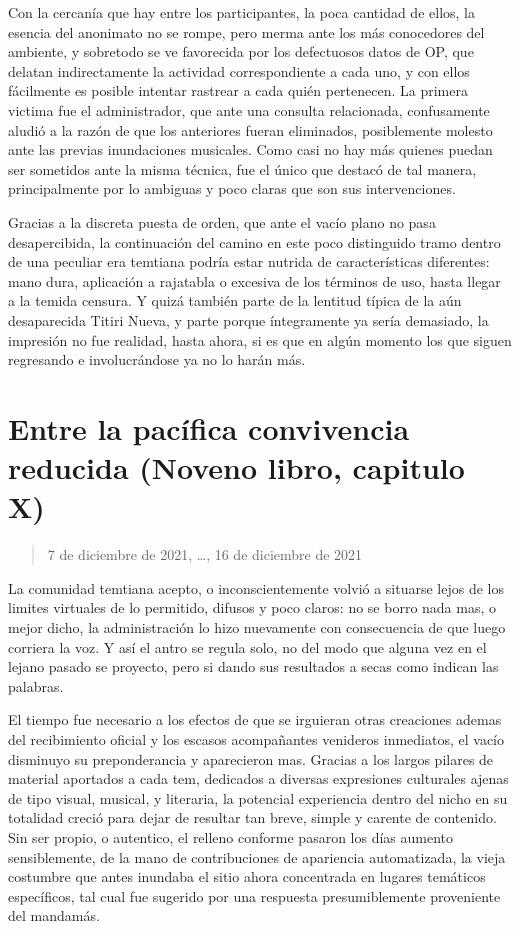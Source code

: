 \documentclass[
  spanish,
]{book}
\begin{document}
Con la cercanía que hay entre los participantes, la poca cantidad de ellos, la esencia del anonimato no se rompe, pero merma ante los más conocedores del ambiente, y sobretodo se ve favorecida por los defectuosos datos de OP, que delatan indirectamente la actividad correspondiente a cada uno, y con ellos fácilmente es posible intentar rastrear a cada quién pertenecen. La primera victima fue el administrador, que ante una consulta relacionada, confusamente aludió a la razón de que los anteriores fueran eliminados, posiblemente molesto ante las previas inundaciones musicales. Como casi no hay más quienes puedan ser sometidos ante la misma técnica, fue el único que destacó de tal manera, principalmente por lo ambiguas y poco claras que son sus intervenciones.

Gracias a la discreta puesta de orden, que ante el vacío plano no pasa desapercibida, la continuación del camino en este poco distinguido tramo dentro de una peculiar era temtiana podría estar nutrida de características diferentes: mano dura, aplicación a rajatabla o excesiva de los términos de uso, hasta llegar a la temida censura. Y quizá también parte de la lentitud típica de la aún desaparecida Titiri Nueva, y parte porque íntegramente ya sería demasiado, la impresión no fue realidad, hasta ahora, si es que en algún momento los que siguen regresando e involucrándose ya no lo harán más.

\hypertarget{entre-la-pacuxedfica-convivencia-reducida-noveno-libro-capitulo-x}{%
\section{Entre la pacífica convivencia reducida (Noveno libro, capitulo X)}\label{entre-la-pacuxedfica-convivencia-reducida-noveno-libro-capitulo-x}}

\begin{quote}
7 de diciembre de 2021, \ldots, 16 de diciembre de 2021
\end{quote}

La comunidad temtiana acepto, o inconscientemente volvió a situarse lejos de los limites virtuales de lo permitido, difusos y poco claros: no se borro nada mas, o mejor dicho, la administración lo hizo nuevamente con consecuencia de que luego corriera la voz. Y así el antro se regula solo, no del modo que alguna vez en el lejano pasado se proyecto, pero si dando sus resultados a secas como indican las palabras.

El tiempo fue necesario a los efectos de que se irguieran otras creaciones ademas del recibimiento oficial y los escasos acompañantes venideros inmediatos, el vacío disminuyo su preponderancia y aparecieron mas. Gracias a los largos pilares de material aportados a cada tem, dedicados a diversas expresiones culturales ajenas de tipo visual, musical, y literaria, la potencial experiencia dentro del nicho en su totalidad creció para dejar de resultar tan breve, simple y carente de contenido. Sin ser propio, o autentico, el relleno conforme pasaron los días aumento sensiblemente, de la mano de contribuciones de apariencia automatizada, la vieja costumbre que antes inundaba el sitio ahora concentrada en lugares temáticos específicos, tal cual fue sugerido por una respuesta presumiblemente proveniente del mandamás.
\end{document}
